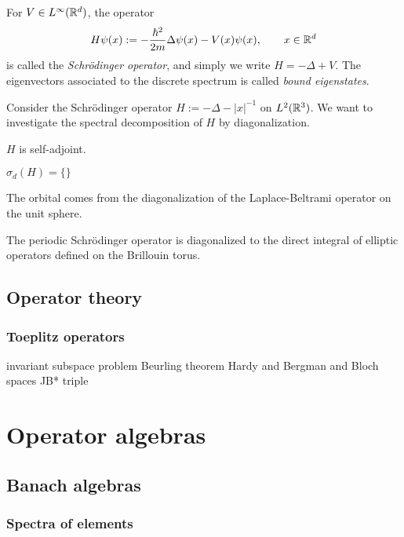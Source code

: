 \documentclass{../../large}
\begin{document}
\begin{prb}
For $V\in L^\infty(\mathbb{R}^d)$, the operator
\[H\psi(x):=-\frac{\hbar^2}{2m}\Delta\psi(x)-V(x)\psi(x),\qquad x\in\mathbb{R}^d\]
is called the \emph{Schr\"odinger operator}, and simply we write $H=-\Delta+V$.
The eigenvectors associated to the discrete spectrum is called \emph{bound eigenstates}.

Consider the Schr\"odinger operator $H:=-\Delta-|x|^{-1}$ on $L^2(\mathbb{R}^3)$.
We want to investigate the spectral decomposition of $H$ by diagonalization.
\begin{parts}
\item $H$ is self-adjoint.
\item $\sigma_d(H)=\{\}$
\end{parts}
\end{prb}

The orbital comes from the diagonalization of the Laplace-Beltrami operator on the unit sphere.

The periodic Schr\"odinger operator is diagonalized to the direct integral of elliptic operators defined on the Brillouin torus.



\chapter{Operator theory}
\section{Toeplitz operators}

invariant subspace problem
Beurling theorem
Hardy and Bergman and Bloch spaces
JB* triple





\part{Operator algebras}
\chapter{Banach algebras}

\section{Spectra of elements}
\end{document}
